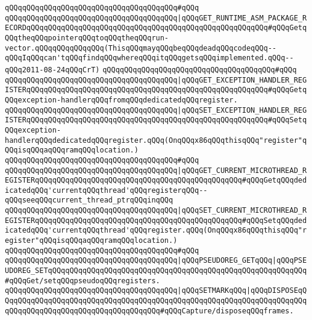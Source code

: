 \verb|qQQqqQQqqQQqqQQqqQQqqQQqqQQqqQQqqQQqqQQq#qQQq|\newline
\verb|qQQqqQQqqQQqqQQqqQQqqQQqqQQqqQQqqQQqqQQq|\verb#|qQQqGET_RUNTIME_ASM_PACKAGE_RECORDqQQqqQQqqQQqqQQqqQQqqQQqqQQqqQQqqQQqqQQqqQQqqQQqqQQqqQQq#\verb|#qQQqGetqQQqtheqQQqpointerqQQqtoqQQqtheqQQqrun-vector.qQQqqQQqqQQqqQQq(ThisqQQqmayqQQqbeqQQqdeadqQQqcodeqQQq--qQQqIqQQqcan'tqQQqfindqQQqwhereqQQqitqQQqgetsqQQqimplemented.qQQq--qQQq2011-08-24qQQqCrT)|\newline
\verb|qQQqqQQqqQQqqQQqqQQqqQQqqQQqqQQqqQQqqQQq#qQQq|\newline
\verb|qQQqqQQqqQQqqQQqqQQqqQQqqQQqqQQqqQQqqQQq|\verb#|qQQqGET_EXCEPTION_HANDLER_REGISTERqQQqqQQqqQQqqQQqqQQqqQQqqQQqqQQqqQQqqQQqqQQqqQQqqQQqqQQq#\verb|#qQQqGetqQQqexception-handlerqQQqfromqQQqdedicatedqQQqregister.|\newline
\verb|qQQqqQQqqQQqqQQqqQQqqQQqqQQqqQQqqQQqqQQq|\verb#|qQQqSET_EXCEPTION_HANDLER_REGISTERqQQqqQQqqQQqqQQqqQQqqQQqqQQqqQQqqQQqqQQqqQQqqQQqqQQqqQQq#\verb|#qQQqSetqQQqexception-handlerqQQqdedicatedqQQqregister.qQQq(OnqQQqx86qQQqthisqQQq"register"qQQqisqQQqaqQQqramqQQqlocation.)|\newline
\verb|qQQqqQQqqQQqqQQqqQQqqQQqqQQqqQQqqQQqqQQq#qQQq|\newline
\verb|qQQqqQQqqQQqqQQqqQQqqQQqqQQqqQQqqQQqqQQq|\verb#|qQQqGET_CURRENT_MICROTHREAD_REGISTERqQQqqQQqqQQqqQQqqQQqqQQqqQQqqQQqqQQqqQQqqQQqqQQq#\verb|#qQQqGetqQQqdedicatedqQQq'currentqQQqthread'qQQqregisterqQQq--qQQqseeqQQqcurrent_thread_ptrqQQqinqQQq|\newline
\verb|qQQqqQQqqQQqqQQqqQQqqQQqqQQqqQQqqQQqqQQq|\verb#|qQQqSET_CURRENT_MICROTHREAD_REGISTERqQQqqQQqqQQqqQQqqQQqqQQqqQQqqQQqqQQqqQQqqQQqqQQq#\verb|#qQQqSetqQQqdedicatedqQQq'currentqQQqthread'qQQqregister.qQQq(OnqQQqx86qQQqthisqQQq"register"qQQqisqQQqaqQQqramqQQqlocation.)|\newline
\verb|qQQqqQQqqQQqqQQqqQQqqQQqqQQqqQQqqQQqqQQq#qQQq|\newline
\verb|qQQqqQQqqQQqqQQqqQQqqQQqqQQqqQQqqQQqqQQq|\verb#|qQQqPSEUDOREG_GETqQQq|qQQqPSEUDOREG_SETqQQqqQQqqQQqqQQqqQQqqQQqqQQqqQQqqQQqqQQqqQQqqQQqqQQqqQQqqQQq#\verb|#qQQqGet/setqQQqpseudoqQQqregisters.|\newline
\verb|qQQqqQQqqQQqqQQqqQQqqQQqqQQqqQQqqQQqqQQq|\verb#|qQQqSETMARKqQQq|qQQqDISPOSEqQQqqQQqqQQqqQQqqQQqqQQqqQQqqQQqqQQqqQQqqQQqqQQqqQQqqQQqqQQqqQQqqQQqqQQqqQQqqQQqqQQqqQQqqQQqqQQqqQQqqQQqqQQq#\verb|#qQQqCapture/disposeqQQqframes.|\newline
